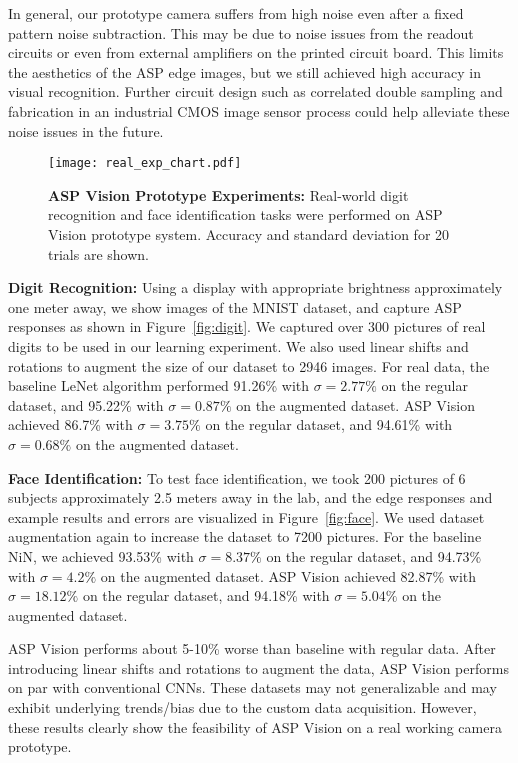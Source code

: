 \documentclass[10pt,twocolumn,letterpaper]{article}
\begin{document}
In general, our prototype camera suffers from high noise even after a fixed pattern noise subtraction. This may be due to noise issues from the readout circuits or even from external amplifiers on the printed circuit board. This limits the aesthetics of the ASP edge images, but we still achieved high accuracy in visual recognition. Further circuit design such as correlated double sampling and fabrication in an industrial CMOS image sensor process could help alleviate these noise issues in the future. 

\begin{figure}[t]
\begin{center}
   \texttt{[image: real\_exp\_chart.pdf]}
\end{center}
   \caption{\textbf{ASP Vision Prototype Experiments:} Real-world digit recognition and face identification tasks were performed on ASP Vision prototype system. Accuracy and standard deviation for 20 trials are shown.}
\label{fig:realresults}
\end{figure}\textbf{Digit Recognition:} Using a display with appropriate brightness approximately one meter away, we show images of the MNIST dataset, and capture ASP responses as shown in Figure~\ref{fig:digit}. We captured over 300 pictures of real digits to be used in our learning experiment. We also used linear shifts and rotations to augment the size of our dataset to 2946 images. For real data, the baseline LeNet algorithm performed 91.26\% with $\sigma = 2.77\%$ on the regular dataset, and 95.22\% with $\sigma = 0.87\%$ on the augmented dataset. ASP Vision achieved 86.7\% with $\sigma = 3.75\%$ on the regular dataset, and 94.61\% with $\sigma = 0.68\%$ on the augmented dataset.

\textbf{Face Identification:} To test face identification, we took 200 pictures of 6 subjects approximately 2.5 meters away in the lab, and the edge responses and example results and errors are visualized in Figure~\ref{fig:face}. We used dataset augmentation again to increase the dataset to 7200 pictures. For the baseline NiN, we achieved 93.53\% with $\sigma = 8.37\%$ on the regular dataset, and 94.73\% with $\sigma = 4.2\%$ on the augmented dataset. ASP Vision achieved 82.87\% with $\sigma = 18.12\%$ on the regular dataset, and 94.18\% with $\sigma = 5.04\%$ on the augmented dataset. 

ASP Vision performs about 5-10\% worse than baseline with regular data. After introducing linear shifts and rotations to augment the data, ASP Vision performs on par with conventional CNNs. These datasets may not generalizable and may exhibit underlying trends/bias due to the custom data acquisition. However, these results clearly show the feasibility of ASP Vision on a real working camera prototype. 
\end{document}
